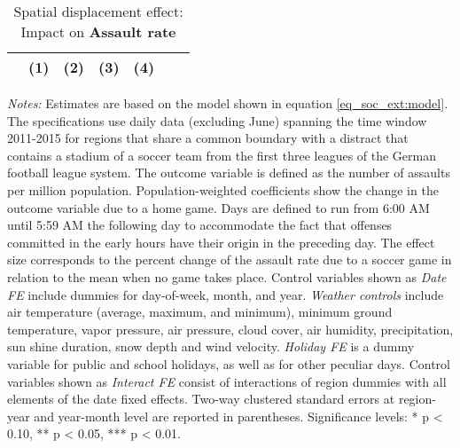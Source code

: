 \documentclass[11pt, a4paper]{article} %
\begin{document}
\begin{landscape}
\begin{table}[H]
\begin{threeparttable}
\begin{tablenotes}
			\end{tablenotes} 
		\end{threeparttable} 
	\end{table}
	\vspace*{\fill}\clearpage 
\end{landscape}
\restoregeometry 

\vspace*{\fill}
\begin{table}[H] \centering 
	\begin{threeparttable} \centering \caption{Spatial displacement effect: Impact on \textbf{Assault rate}}\label{tab_soc_ext:reg_fe_assrate_neighbor_regions}
		{\def\sym#1{\ifmmode^{#1}\else\(^{#1}\)\fi} 
			\begin{tabular}{l*{6}{c}}
				\toprule 
				&\multicolumn{1}{c}{(1)}&\multicolumn{1}{c}{(2)}&\multicolumn{1}{c}{(3)}&\multicolumn{1}{c}{(4)}\\
				\midrule
				 
				\bottomrule 
		\end{tabular}}
		\begin{tablenotes} 
			\item \scriptsize \emph{Notes:} Estimates are based on the model shown in equation \ref{eq_soc_ext:model}. The specifications use daily data (excluding June) spanning the time window 2011-2015 for regions that share a common boundary with a distract that contains a stadium of a soccer team from the first three leagues of the German football league system. The outcome variable is defined as the number of assaults per million population. Population-weighted coefficients show the change in the outcome variable due to a home game. Days are defined to run from 6:00 AM until 5:59 AM the following day to accommodate the fact that offenses committed in the early hours have their origin in the preceding day. The effect size corresponds to the percent change of the assault rate due to a soccer game in relation to the mean when no game takes place. Control variables shown as \textit{Date FE} include dummies for day-of-week, month, and year. \textit{Weather controls} include air temperature (average, maximum, and minimum), minimum ground temperature, vapor pressure, air pressure, cloud cover, air humidity, precipitation, sun shine duration, snow depth and wind velocity. \textit{Holiday FE} is a dummy variable for public and school holidays, as well as for other peculiar days. Control variables shown as \textit{Interact FE} consist of interactions of region dummies with all elements of the date fixed effects. Two-way clustered standard errors at region-year and year-month level are reported in parentheses. \newline Significance levels: * p < 0.10, ** p < 0.05, *** p < 0.01.
		\end{tablenotes} 
	\end{threeparttable} 
\end{table}
\vspace*{\fill}\clearpage 
\end{document}
